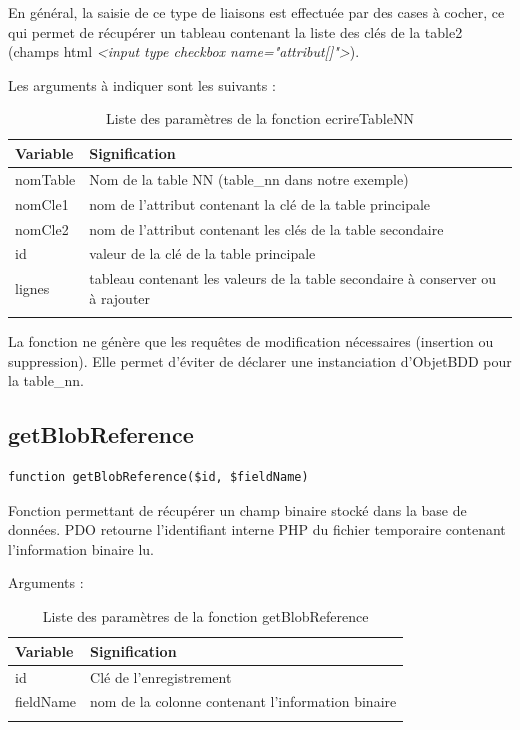 En général, la saisie de ce type de liaisons est effectuée par des cases à cocher, ce qui permet de récupérer un tableau contenant la liste des clés de la table2 (champs html \textit{<input type checkbox name="attribut[]">}).

Les arguments à indiquer sont les suivants :
\begin{longtable}{|p{3cm}|p{10cm}|}
\hline
\textbf{Variable} & \textbf{Signification} \\
\hline
\endhead
\hline\endfoot\endlastfoot
nomTable & Nom de la table NN (table\_nn dans notre exemple) \\

nomCle1 & nom de l'attribut contenant la clé de la table principale \\

nomCle2 & nom de l'attribut contenant les clés de la table secondaire \\

id & valeur de la clé de la table principale \\

lignes & tableau contenant les valeurs de la table secondaire à conserver ou à rajouter \\
\hline

\caption{Liste des paramètres de la fonction ecrireTableNN}
\end{longtable}

La fonction ne génère que les requêtes de modification nécessaires (insertion ou suppression). Elle permet d'éviter de déclarer une instanciation d'ObjetBDD pour la table\_nn.

\subsection{getBlobReference}

\begin{lstlisting}
function getBlobReference($id, $fieldName)
\end{lstlisting}

Fonction permettant de récupérer un champ binaire stocké dans la base de données. PDO retourne l'identifiant interne PHP du fichier temporaire contenant l'information binaire lu.

Arguments :
\begin{longtable}{|p{3cm}|p{10cm}|}
\hline
\textbf{Variable} & \textbf{Signification} \\
\hline
\endhead
\hline\endfoot\endlastfoot
id & Clé de l'enregistrement \\

fieldName & nom de la colonne contenant l'information binaire \\
\hline
\caption{Liste des paramètres de la fonction getBlobReference}
\end{longtable}

